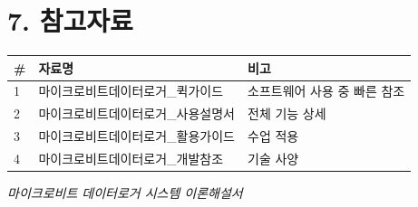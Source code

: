 \documentclass[11pt,a4paper]{article}
\begin{document}
\section*{7. 참고자료}

\begin{center}
\renewcommand{\arraystretch}{1.4}
\begin{tabular}{|p{1.5cm}|p{6.9cm}|p{6.6cm}|}
\hline
\rowcolor{tableheader}
\textbf{\#} & \textbf{자료명} & \textbf{비고} \\
\hline
1 & 마이크로비트데이터로거\_퀵가이드 & 소프트웨어 사용 중 빠른 참조 \\
\hline
2 & 마이크로비트데이터로거\_사용설명서 & 전체 기능 상세 \\
\hline
3 & 마이크로비트데이터로거\_활용가이드 & 수업 적용 \\
\hline
4 & 마이크로비트데이터로거\_개발참조 & 기술 사양 \\
\hline
\end{tabular}
\end{center}


\vfill
\begin{center}
\small\color{lightbrown}
\textit{마이크로비트 데이터로거 시스템 이론해설서}
\end{center}
\end{document}

